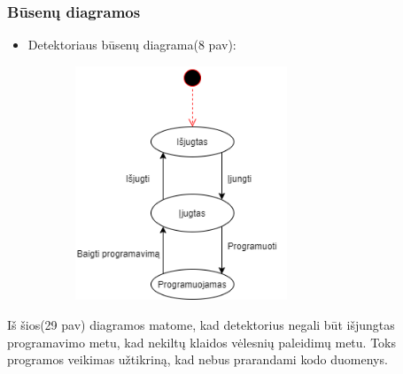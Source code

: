\documentclass[oneside]{VUMIFPSkursinis}
\begin{document}
\subsubsection{Būsenų diagramos}
\begin{itemize}
\item Detektoriaus būsenų diagrama(8 pav):

		\begin{figure}[H]
		\centering	
	\includegraphics[width=7cm,height=7cm,keepaspectratio]{BusenuDetektorius.png}
	\caption{}
	\label{fig:BusenuDetektorius}
\end{figure}

\end{itemize}
Iš šios(29 pav) diagramos  matome, kad detektorius negali būt išjungtas programavimo metu, kad nekiltų klaidos vėlesnių paleidimų metu. Toks programos veikimas užtikriną, kad nebus prarandami kodo duomenys. 
\end{document}
